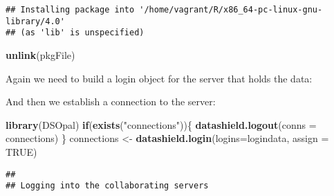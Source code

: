 \documentclass[
]{book}
\newenvironment{Shaded}{\begin{snugshade}}{\end{snugshade}}
\newcommand{\CommentTok}[1]{\textcolor[rgb]{0.56,0.35,0.01}{\textit{#1}}}
\newcommand{\ControlFlowTok}[1]{\textcolor[rgb]{0.13,0.29,0.53}{\textbf{#1}}}
\newcommand{\DataTypeTok}[1]{\textcolor[rgb]{0.13,0.29,0.53}{#1}}
\newcommand{\KeywordTok}[1]{\textcolor[rgb]{0.13,0.29,0.53}{\textbf{#1}}}
\newcommand{\NormalTok}[1]{#1}
\newcommand{\OperatorTok}[1]{\textcolor[rgb]{0.81,0.36,0.00}{\textbf{#1}}}
\newcommand{\OtherTok}[1]{\textcolor[rgb]{0.56,0.35,0.01}{#1}}
\newcommand{\StringTok}[1]{\textcolor[rgb]{0.31,0.60,0.02}{#1}}
\begin{document}
\begin{verbatim}
## Installing package into '/home/vagrant/R/x86_64-pc-linux-gnu-library/4.0'
## (as 'lib' is unspecified)
\end{verbatim}

\begin{Shaded}
\begin{Highlighting}[]
\KeywordTok{unlink}\NormalTok{(pkgFile)}
\end{Highlighting}
\end{Shaded}

Again we need to build a login object for the server that holds the data:

\begin{Shaded}
\end{Shaded}

And then we establish a connection to the server:

\begin{Shaded}
\begin{Highlighting}[]
\KeywordTok{library}\NormalTok{(DSOpal)}
\ControlFlowTok{if}\NormalTok{(}\KeywordTok{exists}\NormalTok{(}\StringTok{"connections"}\NormalTok{))\{}
  \KeywordTok{datashield.logout}\NormalTok{(}\DataTypeTok{conns =}\NormalTok{ connections)}
\NormalTok{\}}
\NormalTok{connections <-}\StringTok{ }\KeywordTok{datashield.login}\NormalTok{(}\DataTypeTok{logins=}\NormalTok{logindata, }\DataTypeTok{assign =} \OtherTok{TRUE}\NormalTok{)}
\end{Highlighting}
\end{Shaded}

\begin{verbatim}
## 
## Logging into the collaborating servers
\end{verbatim}
\end{document}
